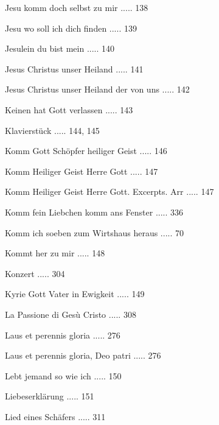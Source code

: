 \documentclass[twocolumn]{book}
\begin{document}
\newline 
Jesu komm doch selbst zu mir ..... 138

\newline 
Jesu wo soll ich dich finden ..... 139

\newline 
Jesulein du bist mein ..... 140

\newline 
Jesus Christus unser Heiland ..... 141

\newline 
Jesus Christus unser Heiland der von uns ..... 142

\newline 
Keinen hat Gott verlassen ..... 143

\newline 
Klavierstück ..... 144, 145

\newline 
Komm Gott Schöpfer heiliger Geist ..... 146

\newline 
Komm Heiliger Geist Herre Gott ..... 147

\newline 
Komm Heiliger Geist Herre Gott. Excerpts. Arr ..... 147

\newline 
Komm fein Liebchen komm ans Fenster ..... 336

\newline 
Komm ich soeben zum Wirtshaus heraus ..... 70

\newline 
Kommt her zu mir ..... 148

\newline 
Konzert ..... 304

\newline 
Kyrie Gott Vater in Ewigkeit ..... 149

\newline 
La Passione di Gesù Cristo ..... 308

\newline 
Laus et perennis gloria ..... 276

\newline 
Laus et perennis gloria, Deo patri ..... 276

\newline 
Lebt jemand so wie ich ..... 150

\newline 
Liebeserklärung ..... 151

\newline 
Lied eines Schäfers ..... 311
\end{document}
